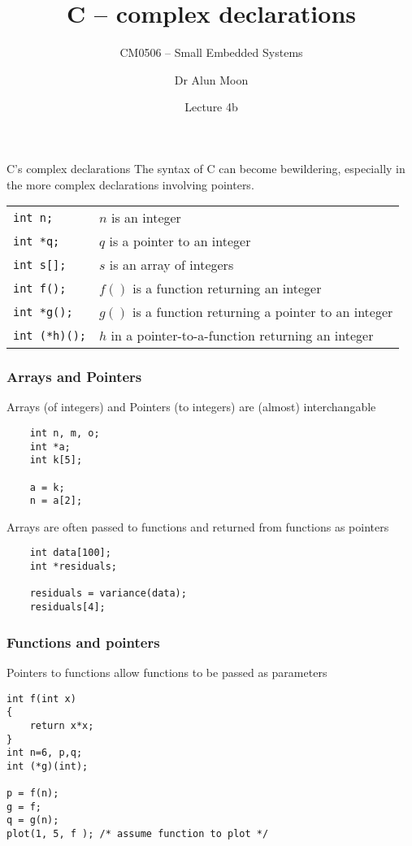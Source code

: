 \documentclass[svgnames,x11names]{beamer}
\title{C -- complex declarations}
\subtitle{CM0506 -- Small Embedded Systems}
\date{Lecture 4b}
\author{Dr Alun Moon}
\institute{Department of Computer and Information Science}
\begin{document}
\frame\maketitle

\begin{frame}[fragile]{C's complex declarations}
The syntax of C can become bewildering, especially in the more complex declarations involving pointers.   
  \vspace{1em}

\begin{tabular}{ll}\toprule
  \texttt{int n;} & $n$ is an integer \\
  \texttt{int *q;} & $q$ is a pointer to an integer\\
  \texttt{int s[];} & $s$ is an array of integers\\
  \texttt{int f();} & $f()$ is a function returning an
                             integer\\
  \texttt{int *g();} & $g()$ is a function returning a pointer
                              to an integer\\
  \texttt{int (*h)();} & $h$ in a pointer-to-a-function
                               returning an integer\\\bottomrule
\end{tabular}
\end{frame}

\begin{frame}
  \frametitle{Arrays and Pointers}
  Arrays (of integers) and Pointers (to integers) are (almost) interchangable
  \begin{block}{}
\begin{verbatim}
    int n, m, o;
    int *a;
    int k[5];

    a = k;
    n = a[2];
\end{verbatim}
  \end{block}
  Arrays are often passed to functions and returned from functions as
  pointers
  \begin{block}{}
\begin{verbatim}
    int data[100];
    int *residuals;

    residuals = variance(data);
    residuals[4];
\end{verbatim}
  \end{block}
\end{frame}

\begin{frame}[fragile]
  \frametitle{Functions and pointers}
  Pointers to functions allow functions to be passed as parameters
  \begin{block}{}
\begin{verbatim}
int f(int x)
{
    return x*x;
}
int n=6, p,q;
int (*g)(int);

p = f(n);
g = f;
q = g(n);
plot(1, 5, f ); /* assume function to plot */
\end{verbatim}
  \end{block}
\end{frame}
\end{document}
